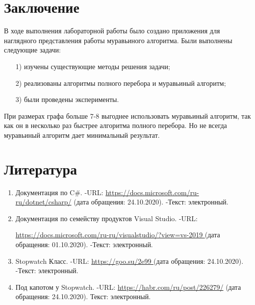 \documentclass[14pt, a4paper]{extarticle}
\begin{document}
\section*{Заключение}
В ходе выполнения лабораторной работы было создано приложения для наглядного представления работы муравьиного алгоритма. Были выполнены следующие задачи:
\begin{enumerate}
	\item[1)] изучены существующие методы решения задачи;
	\item[2)] реализованы алгоритмы полного перебора и муравьиный алгоритм;
	\item[3)] были проведены эксперименты.
\end{enumerate}\par
При размерах графа больше 7-8 выгоднее использовать муравьиный алгоритм, так как он в несколько раз быстрее алгоритма полного перебора. Но не всегда муравьиный алгоритм дает минимальный результат.

\clearpage
\section*{Литература}
\begin{enumerate}
	\label{literature}
	\item  Документация по C\#. -URL: \href{https://docs.microsoft.com/ru-ru/dotnet/csharp/}{https://docs.microsoft.com/ru-ru/dotnet/csharp/} (дата обращения: 24.10.2020). -Текст: электронный.
	\item Документация по семейству продуктов Visual Studio. -URL:\par \href{https://docs.microsoft.com/ru-ru/visualstudio/?view=vs-2019}{https://docs.microsoft.com/ru-ru/visualstudio/?view=vs-2019 } (дата обращения: 01.10.2020). -Текст: электронный.
	\item Stopwatch Класс. -URL: \href{https://goo.su/2e99}{https://goo.su/2e99 } (дата обращения: 24.10.2020). -Текст: электронный.
	\item Под капотом у Stopwatch. -URL:  \href{https://habr.com/ru/post/226279/}{https://habr.com/ru/post/226279/} (дата обращения: 24.10.2020). Текст: электронный.
\end{enumerate}
\end{document}
